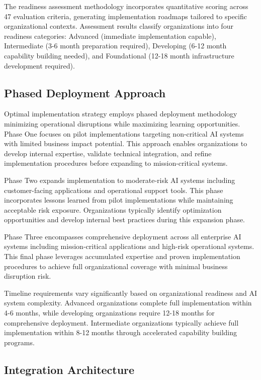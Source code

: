 \documentclass[11pt,letterpaper]{article}
\begin{document}
The readiness assessment methodology incorporates quantitative scoring across 47 evaluation criteria, generating implementation roadmaps tailored to specific organizational contexts. Assessment results classify organizations into four readiness categories: Advanced (immediate implementation capable), Intermediate (3-6 month preparation required), Developing (6-12 month capability building needed), and Foundational (12-18 month infrastructure development required).

\subsection{Phased Deployment Approach}

Optimal implementation strategy employs phased deployment methodology minimizing operational disruptions while maximizing learning opportunities. Phase One focuses on pilot implementations targeting non-critical AI systems with limited business impact potential. This approach enables organizations to develop internal expertise, validate technical integration, and refine implementation procedures before expanding to mission-critical systems.

Phase Two expands implementation to moderate-risk AI systems including customer-facing applications and operational support tools. This phase incorporates lessons learned from pilot implementations while maintaining acceptable risk exposure. Organizations typically identify optimization opportunities and develop internal best practices during this expansion phase.

Phase Three encompasses comprehensive deployment across all enterprise AI systems including mission-critical applications and high-risk operational systems. This final phase leverages accumulated expertise and proven implementation procedures to achieve full organizational coverage with minimal business disruption risk.

Timeline requirements vary significantly based on organizational readiness and AI system complexity. Advanced organizations complete full implementation within 4-6 months, while developing organizations require 12-18 months for comprehensive deployment. Intermediate organizations typically achieve full implementation within 8-12 months through accelerated capability building programs.

\subsection{Integration Architecture}
\end{document}
